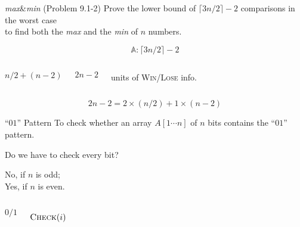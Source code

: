 \begin{frame}{}
  \begin{exampleblock}{\textsl{max}\&\textsl{min} (Problem 9.1-2)}
    Prove the lower bound of $\lceil 3n/2 \rceil - 2$ comparisons in the worst case \\
    to find both the \textsl{max} and the \textsl{min} of $n$ numbers.
  \end{exampleblock}

  \pause
  \[
    \mathbb{A}: \lceil 3n/2 \rceil - 2
  \]

  \pause
  \begin{columns}
      \centerline{}
      \[
	n/2 + (n-2)
      \]
      \centerline{}
      \[
	2n - 2 
      \]
      \centerline{units of \textsc{Win/Lose} info.}
  \end{columns}

  \pause
  \vspace{0.30cm}
  \[
    2n - 2 = 2 \times (n/2) + 1 \times (n-2)
  \]
\end{frame}

\begin{frame}{}
  \begin{exampleblock}{``$01$'' Pattern}
    To check whether an array $A[1 \cdots n]$ of $n$ bits contains the ``$01$'' pattern.

    Do we have to check every bit?
  \end{exampleblock}

  \pause
  \vspace{0.50cm}
  \begin{center}
    No, if $n$ is odd; \\[8pt]
    Yes, if $n$ is even.
  \end{center}
\end{frame}

\begin{frame}{}

  \centerline{}
  
  \pause
\end{frame}

\begin{frame}{}
  \begin{columns}
      \centerline{}
      \[
	0/1
      \]
      \centerline{}
      \[
	\textsc{Check}(i)
      \]
  \end{columns}

  \pause
  \vspace{0.60cm}
\end{frame}

